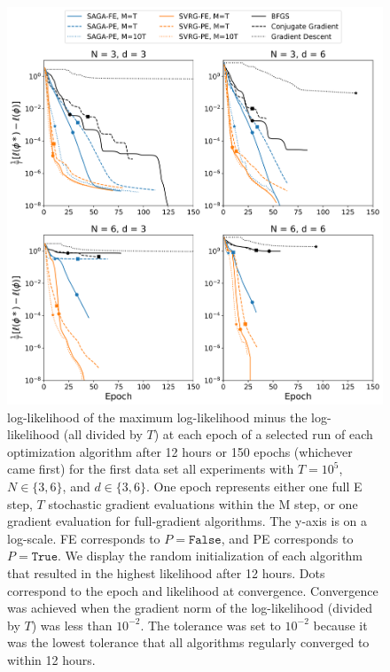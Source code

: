 
\begin{figure}[h]
    \centering
    \includegraphics[width=5in]{../plt/log-like_v_epoch_T-100000-000.png}
    \caption{log-likelihood of the maximum log-likelihood minus the log-likelihood (all divided by $T$) at each epoch of a selected run of each optimization algorithm after 12 hours or 150 epochs (whichever came first) for the first data set all experiments with $T=10^{5}$, $N \in \{3,6\}$, and $d \in \{3,6\}$. One epoch represents either one full E step, $T$ stochastic gradient evaluations within the M step, or one gradient evaluation for full-gradient algorithms. The y-axis is on a log-scale. FE corresponds to $P = \texttt{False}$, and PE corresponds to $P = \texttt{True}$. We display the random initialization of each algorithm that resulted in the highest likelihood after 12 hours. Dots correspond to the epoch and likelihood at convergence. Convergence was achieved when the gradient norm of the log-likelihood (divided by $T$) was less than $10^{-2}$. The tolerance was set to $10^{-2}$ because it was the lowest tolerance that all algorithms regularly converged to within 12 hours.}
    \label{fig:ll_trace_sim}
\end{figure}
